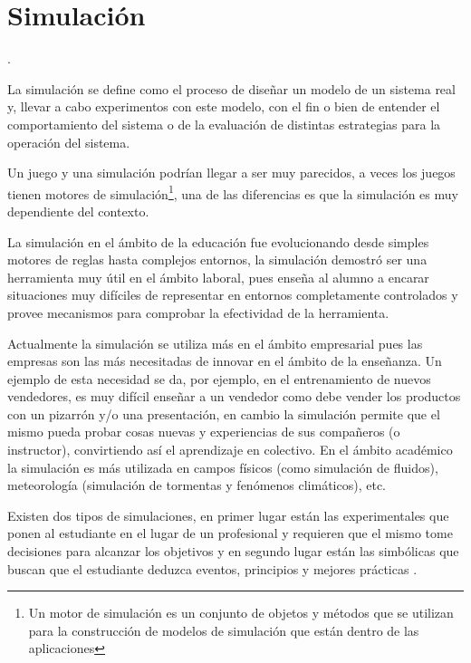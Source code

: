 \section{Simulación}
\label{sec:tics_SIMULACION}


.

La simulación se define como el proceso de diseñar un modelo de un sistema real
y, llevar a cabo experimentos con este modelo, con el fin o bien de entender el
comportamiento del sistema o de la evaluación de distintas estrategias para la
operación del sistema\cite{ingalls2008introduction}. 

Un juego y una simulación podrían llegar a ser muy parecidos, a veces los juegos
tienen motores de simulación\footnote{Un motor de simulación es un conjunto de
objetos y métodos que se utilizan para la construcción de modelos de
simulación que están dentro de las aplicaciones}, una de las diferencias
es que la simulación es muy dependiente del contexto. 

La simulación en el ámbito de la educación fue evolucionando desde simples
motores de reglas hasta complejos entornos, la simulación demostró ser una
herramienta muy útil en el ámbito laboral\cite{mariluz:seiousgames}, pues enseña
al alumno a encarar situaciones muy difíciles de representar en entornos
completamente controlados y provee mecanismos para comprobar la efectividad de
la herramienta. 

Actualmente la simulación se utiliza más en el ámbito empresarial pues las
empresas son las más necesitadas de innovar en el ámbito de la enseñanza. Un
ejemplo de esta necesidad se da, por ejemplo, en el entrenamiento de nuevos
vendedores, es muy difícil enseñar a un vendedor como debe vender los productos
con un pizarrón y/o una presentación, en cambio la simulación permite que el
mismo pueda probar cosas nuevas y experiencias de sus compañeros (o instructor),
convirtiendo así el aprendizaje en colectivo\cite{mariluz:seiousgames}. En el
ámbito académico la simulación es más utilizada en campos físicos (como simulación
de fluidos), meteorología (simulación de tormentas y fenómenos climáticos), etc. 

Existen dos tipos de simulaciones, en primer lugar están las experimentales que
ponen al estudiante en el lugar de un profesional y requieren que el mismo tome
decisiones para alcanzar los objetivos y en segundo lugar están las simbólicas
que buscan que el estudiante deduzca eventos, principios y mejores prácticas
\cite{charsky:2010}. 

